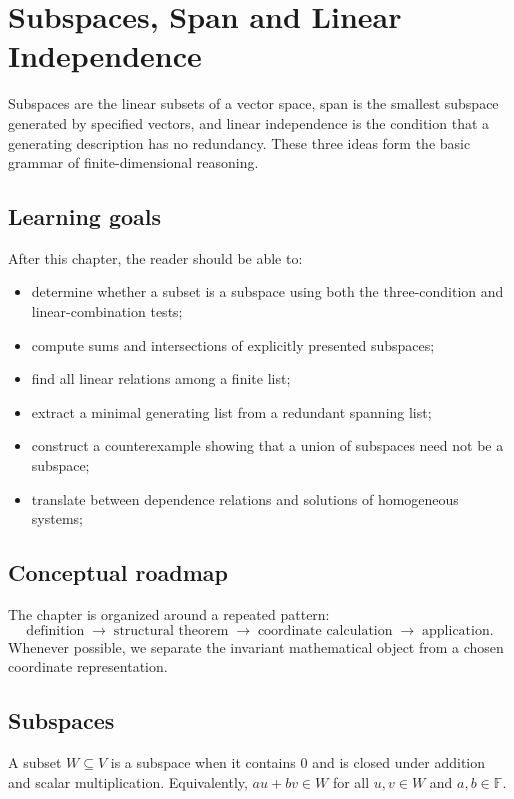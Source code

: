 \chapter{Subspaces, Span and Linear Independence}
\label{ch:i02-subspaces-span-and-linear-independence}

Subspaces are the linear subsets of a vector space, span is the smallest subspace generated by specified vectors, and linear independence is the condition that a generating description has no redundancy. These three ideas form the basic grammar of finite-dimensional reasoning.

\section*{Learning goals}
After this chapter, the reader should be able to:
\begin{itemize}
\item determine whether a subset is a subspace using both the three-condition and linear-combination tests;
\item compute sums and intersections of explicitly presented subspaces;
\item find all linear relations among a finite list;
\item extract a minimal generating list from a redundant spanning list;
\item construct a counterexample showing that a union of subspaces need not be a subspace;
\item translate between dependence relations and solutions of homogeneous systems;
\end{itemize}
\section*{Conceptual roadmap}
The chapter is organized around a repeated pattern:
\[
\boxed{\text{definition}\;\longrightarrow\;\text{structural theorem}\;\longrightarrow\;\text{coordinate calculation}\;\longrightarrow\;\text{application}.}
\]
Whenever possible, we separate the invariant mathematical object from a chosen coordinate representation.

\section{Subspaces}
A subset $W\subseteq V$ is a subspace when it contains $0$ and is closed under addition and scalar multiplication. Equivalently, $au+bv\in W$ for all $u,v\in W$ and $a,b\in\mathbb F$.


